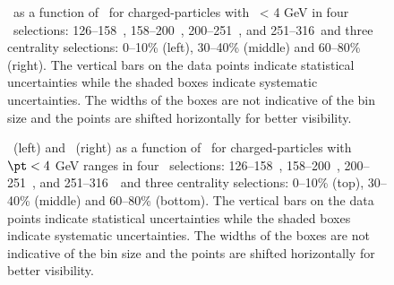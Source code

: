 
\begin{figure}
   \caption{\DeltaTheta\ as a function of \rvar\ for charged-particles with \pt\ < 4 GeV  in 
   four \ptjet\ selections: 126--158~\GeV, 158--200~\GeV, 200--251~\GeV, and 251--316~\GeV and three centrality 
   selections: 0--10\% (left), 30--40\% (middle) and 60--80\% (right). 
   The vertical bars on the data points indicate statistical uncertainties while the shaded boxes indicate systematic uncertainties. The widths of the boxes are not indicative of the bin size and the points are shifted horizontally for better visibility. }
      \label{fig:deltaPdeltaT}
\end{figure}


\begin{figure}
   \caption{\RTheta\ (left) and \RP\ (right) as a function of \rvar\ for charged-particles with $\pt < 4$ GeV ranges in four \ptjet\ selections: 126--158~\GeV, 158--200~\GeV, 200--251~\GeV, and 251--316~\GeV\ and three centrality selections: 0--10\% (top), 30--40\% (middle) and 60--80\% (bottom). The vertical bars on the data points indicate statistical uncertainties while the shaded boxes indicate systematic uncertainties. The widths of the boxes are not indicative of the bin size and the points are shifted horizontally for better visibility. }
      \label{fig:RPRT}
\end{figure}


